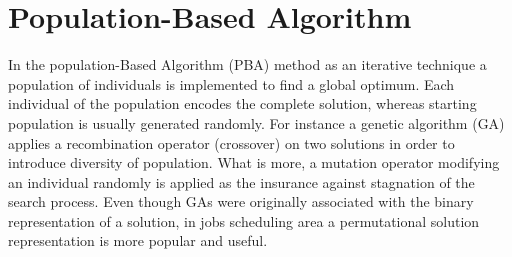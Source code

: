 \section{Population-Based Algorithm}

In the population-Based Algorithm (PBA) method as an iterative technique a population of individuals is implemented to find a global optimum. Each individual of the population
encodes the complete solution, whereas starting population is usually
generated randomly. For instance a genetic algorithm (GA) applies a recombination operator
(crossover) on two solutions in order to introduce diversity of
population. What is more, a mutation operator 
modifying an individual randomly is applied as the insurance against
stagnation of the search process. Even though GAs were
originally associated with the binary representation of a solution, in jobs scheduling area a permutational solution representation is
more popular and useful.

